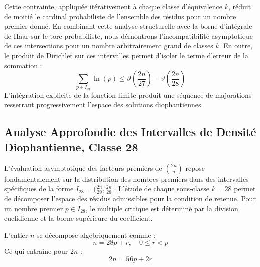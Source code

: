 \documentclass[12pt,a4paper]{article}
\begin{document}
    Cette contrainte, appliquée itérativement à chaque classe d'équivalence $k$, réduit de moitié le cardinal probabiliste de l'ensemble des résidus pour un nombre premier donné.
    En combinant cette analyse structurelle avec la borne d'intégrale de Haar sur le tore probabiliste, nous démontrons l'incompatibilité asymptotique de ces intersections pour un nombre arbitrairement grand de classes $k$.
    En outre, le produit de Dirichlet sur ces intervalles permet d'isoler le terme d'erreur de la sommation :
    \begin{equation}
    \sum_{p \in I_27} \ln(p) \le \vartheta\left(\frac{2n}{27}\right) - \vartheta\left(\frac{2n}{28}\right)
    \end{equation}
    L'intégration explicite de la fonction limite produit une séquence de majorations resserrant progressivement l'espace des solutions diophantiennes.
    
    \newpage
    \subsection{Analyse Approfondie des Intervalles de Densité Diophantienne, Classe 28}
    L'évaluation asymptotique des facteurs premiers de $\binom{2n}{n}$ repose fondamentalement sur la distribution des nombres premiers dans des intervalles spécifiques de la forme $I_28 = (\frac{2n}{29}, \frac{2n}{28}]$.
    L'étude de chaque sous-classe $k = 28$ permet de décomposer l'espace des résidus admissibles pour la condition de retenue.
    Pour un nombre premier $p \in I_28$, le multiple critique est déterminé par la division euclidienne et la borne supérieure du coefficient.

    L'entier $n$ se décompose algébriquement comme :
    \begin{equation}
    n = 28 p + r, \quad 0 \le r < p
    \end{equation}
    Ce qui entraîne pour $2n$ :
    \begin{equation}
    2n = 56 p + 2r
    \end{equation}
\end{document}
